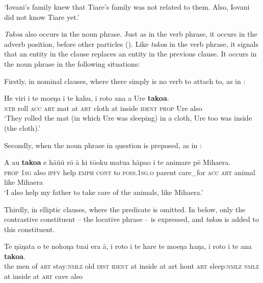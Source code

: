 \glt 
‘Iovani’s family knew that Tiare’s family was not related to them. Also, Iovani did not know Tiare yet.’ \textstyleExampleref{[R238.004–005]}
\z

\textit{Tako{\ꞌ}a} also occurs in the noun phrase. Just as in the verb phrase, it occurs in the adverb position, before other particles (). Like \textit{tako{\ꞌ}a} in the verb phrase, it signals that an entity in the clause replaces an entity in the previous clause. It occurs in the noun phrase in the following situations:

Firstly, in nominal clauses, where there simply is no verb to attach to, as in :

\ea\label{ex:4.135}
\gll He viri i te moeŋa {\ꞌ}i te kahu, {\ꞌ}i roto {\ꞌ}ana a Ure \textbf{tako{\ꞌ}a}. \\
\textsc{ntr} roll \textsc{acc} \textsc{art} mat at \textsc{art} cloth at inside \textsc{ident} \textsc{prop} Ure also \\

\glt
‘They rolled the mat (in which Ure was sleeping) in a cloth, Ure too was inside (the cloth).’ \textstyleExampleref{[Mtx-7-03.016]}
\z

Secondly, when the noun phrase in question is preposed, as in :

\ea\label{ex:4.136}
\gll A au \textbf{tako{\ꞌ}a} e hā{\ꞌ}ū{\ꞌ}ū rō {\ꞌ}ā ki tō{\ꞌ}oku matu{\ꞌ}a hāpa{\ꞌ}o  i te {\ꞌ}animare pē Mihaera.\\
\textsc{prop} \textsc{1sg} also \textsc{ipfv} help \textsc{emph} \textsc{cont} to \textsc{poss.1sg.o} parent care\_for  \textsc{acc} \textsc{art} animal like Mihaera\\

\glt
‘I also help my father to take care of the animals, like Mihaera.’ \textstyleExampleref{[R334.293]} 
\z

Thirdly, in elliptic clauses, where the predicate is omitted. In  below, only the contrastive constituent – the locative phrase – is expressed, and \textit{tako{\ꞌ}a} is added to this constituent. 

\ea\label{ex:4.137}
\gll Te ŋāŋata o te nohoŋa tuai era {\ꞌ}ā, {\ꞌ}i roto i te hare te moeŋa  haŋa, {\ꞌ}i roto i te {\ꞌ}ana \textbf{tako{\ꞌ}a}.\\
the men of \textsc{art} stay:\textsc{nmlz} old \textsc{dist} \textsc{ident} at inside at art hout \textsc{art} sleep:\textsc{nmlz}  \textsc{nmlz} at inside at \textsc{art} cave also\\

